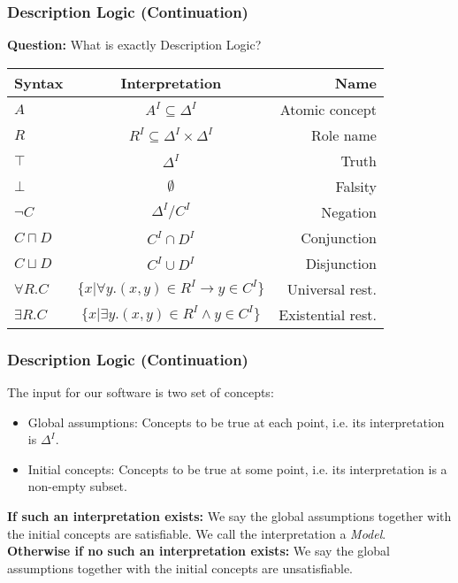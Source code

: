 \begin{frame}
\frametitle{Description Logic (Continuation)}
{\bf Question:} What is exactly Description Logic? \\
\pause
\bigskip
\begin{tabular}{|l|c|r|}
\hline
{\bf Syntax } & {\bf Interpretation } & {\bf Name } \\ \hline
$A$ & $A^{I} \subseteq \Delta^{I}$ & Atomic concept \\ 
$R$ & $R^{I} \subseteq \Delta^{I} \times \Delta^{I}$ & Role name \\
$\top$ & $\Delta^{I}$ & Truth \\
$\bot$ & $\emptyset$ & Falsity \\
$\neg C$ & $\Delta^{I} / C^{I}$ & Negation \\
$C \sqcap D$ & $C^{I} \cap D^{I}$ & Conjunction \\
$C \sqcup D$ & $C^{I} \cup D^{I}$ & Disjunction \\
$\forall R . C$ & $\{x | \forall y . (x,y) \in R^{I} \to y \in C^{I}\}$ & Universal rest. \\
$\exists R . C$ & $\{x | \exists y . (x,y) \in R^{I} \land y \in C^{I}\}$ & Existential rest. \\
\hline 
\end{tabular}
\end{frame}

\begin{frame}
\frametitle{Description Logic (Continuation)}
The input for our software is two set of concepts: \pause
\begin{itemize}
\item Global assumptions: Concepts to be true at each point, i.e. its interpretation is $\Delta^{I}$.
\item Initial concepts: Concepts to be true at some point, i.e. its interpretation is a non-empty subset.
\end{itemize}
\bigskip
{\bf If such an interpretation exists:} We say the global assumptions together with the initial concepts are
satisfiable. We call the interpretation a {\it Model}. \\
\smallskip
\pause
{\bf Otherwise if no such an interpretation exists:} We say the global assumptions together with the initial concepts are unsatisfiable.
\end{frame}
